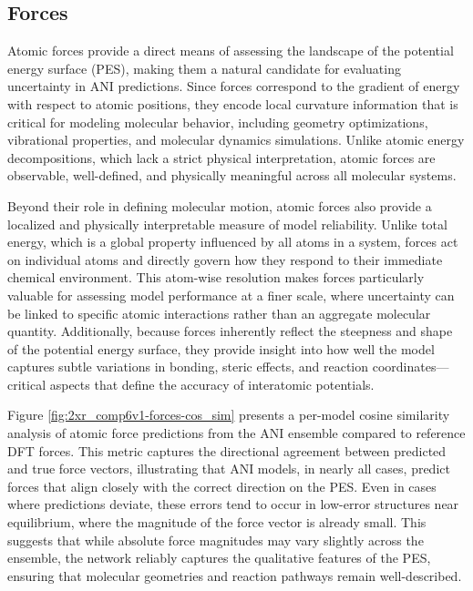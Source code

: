 \subsection{Forces}
\label{subsec:forces}

Atomic forces provide a direct means of assessing the landscape of the potential energy surface (PES), making them a natural candidate for evaluating uncertainty in ANI predictions. Since forces correspond to the gradient of energy with respect to atomic positions, they encode local curvature information that is critical for modeling molecular behavior, including geometry optimizations, vibrational properties, and molecular dynamics simulations. Unlike atomic energy decompositions, which lack a strict physical interpretation, atomic forces are observable, well-defined, and physically meaningful across all molecular systems.

Beyond their role in defining molecular motion, atomic forces also provide a localized and physically interpretable measure of model reliability. Unlike total energy, which is a global property influenced by all atoms in a system, forces act on individual atoms and directly govern how they respond to their immediate chemical environment. This atom-wise resolution makes forces particularly valuable for assessing model performance at a finer scale, where uncertainty can be linked to specific atomic interactions rather than an aggregate molecular quantity. Additionally, because forces inherently reflect the steepness and shape of the potential energy surface, they provide insight into how well the model captures subtle variations in bonding, steric effects, and reaction coordinates—critical aspects that define the accuracy of interatomic potentials.

Figure \ref{fig:2xr_comp6v1-forces-cos_sim} presents a per-model cosine similarity analysis of atomic force predictions from the ANI ensemble compared to reference DFT forces. This metric captures the directional agreement between predicted and true force vectors, illustrating that ANI models, in nearly all cases, predict forces that align closely with the correct direction on the PES. Even in cases where predictions deviate, these errors tend to occur in low-error structures near equilibrium, where the magnitude of the force vector is already small. This suggests that while absolute force magnitudes may vary slightly across the ensemble, the network reliably captures the qualitative features of the PES, ensuring that molecular geometries and reaction pathways remain well-described.

